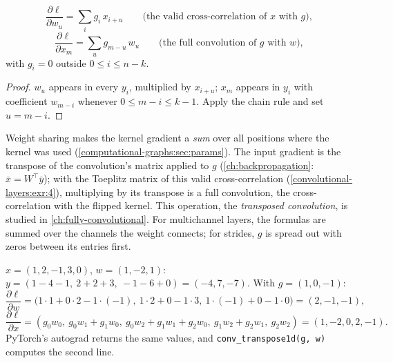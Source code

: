 \begin{notechapter}
\begin{proposition}\label{convolutional-layers:prop:backward}
\[
  \frac{\partial\ell}{\partial w_u} = \sum_ig_i\,x_{i+u}\qquad\text{(the valid cross-correlation of $x$ with $g$)},
\]
\[
  \frac{\partial\ell}{\partial x_m} = \sum_{u}g_{m-u}\,w_u\qquad\text{(the full convolution of $g$ with $w$)},
\]
with $g_i = 0$ outside $0\leq i\leq n - k$.
\end{proposition}

\begin{proof}
$w_u$ appears in every $y_i$, multiplied by $x_{i+u}$; $x_m$ appears in $y_i$ with coefficient $w_{m-i}$ whenever $0\leq m - i\leq k - 1$.
Apply the chain rule and set $u = m - i$.
\end{proof}

Weight sharing makes the kernel gradient a \emph{sum} over all positions where the kernel
was used (\cref{computational-graphs:sec:params}). The input gradient is the transpose of
the convolution's matrix applied to $g$ (\cref{ch:backpropagation}: $\bar x = W^\top\bar y$); with the
Toeplitz matrix of this valid cross-correlation (\cref{convolutional-layers:exr:4}), multiplying by its transpose is
a full convolution, the cross-correlation with the flipped kernel. This operation, the
\emph{transposed convolution}, is studied in \cref{ch:fully-convolutional}. For multichannel
layers, the formulas are summed over the channels the weight connects; for strides,
$g$ is spread out with zeros between its entries first.

\begin{example}\label{convolutional-layers:ex:backward}
$x = (1, 2, -1, 3, 0)$, $w = (1, -2, 1)$: $y = (1 - 4 - 1,\ 2 + 2 + 3,\ -1 - 6 + 0) = (-4, 7, -7)$. With $g = (1, 0, -1)$:
\[
  \frac{\partial\ell}{\partial w} = \bigl(1\cdot1 + 0\cdot2 - 1\cdot(-1),\ 1\cdot2 + 0 - 1\cdot3,\ 1\cdot(-1) + 0 - 1\cdot0\bigr) = (2, -1, -1),
\]
\[
  \frac{\partial\ell}{\partial x} = (g_0w_0,\ g_0w_1 + g_1w_0,\ g_0w_2 + g_1w_1 + g_2w_0,\ g_1w_2 + g_2w_1,\ g_2w_2) = (1, -2, 0, 2, -1) .
\]
PyTorch's autograd returns the same values, and \texttt{conv\_transpose1d(g, w)} computes the
second line.
\end{example}


\end{notechapter}
